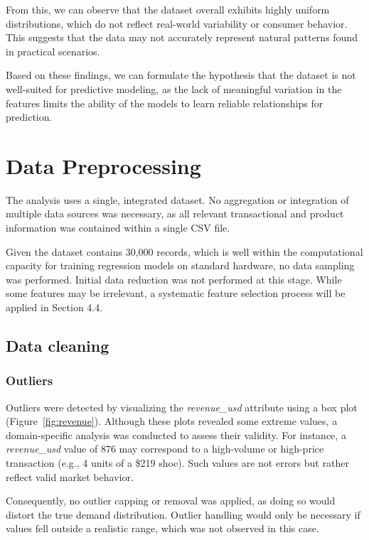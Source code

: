 \documentclass[12pt]{article}
\begin{document}
From this, we can observe that the dataset overall exhibits highly uniform distributions, which do not reflect real-world variability or consumer behavior. This suggests that the data may not accurately represent natural patterns found in practical scenarios.

Based on these findings, we can formulate the hypothesis that the dataset is not well-suited for predictive modeling, as the lack of meaningful variation in the features limits the ability of the models to learn reliable relationships for prediction.


\section{Data Preprocessing}

The analysis uses a single, integrated dataset. No aggregation or integration of multiple data sources was necessary, as all relevant transactional and product information was contained within a single CSV file.

Given the dataset contains 30,000 records, which is well within the computational capacity for training regression models on standard hardware, no data sampling was performed. Initial data reduction was not performed at this stage. While some features may be irrelevant, a systematic feature selection process will be applied in Section 4.4.

\subsection{Data cleaning}

\subsubsection{Outliers}

Outliers were detected by visualizing the \textit{revenue\_usd} attribute using a box plot (Figure~\ref{fig:revenue}). Although these plots revealed some extreme values, a domain-specific analysis was conducted to assess their validity. For instance, a \textit{revenue\_usd} value of 876 may correspond to a high-volume or high-price transaction (e.g., 4 units of a \$219 shoe). Such values are not errors but rather reflect valid market behavior.

Consequently, no outlier capping or removal was applied, as doing so would distort the true demand distribution. Outlier handling would only be necessary if values fell outside a realistic range, which was not observed in this case.
\end{document}
